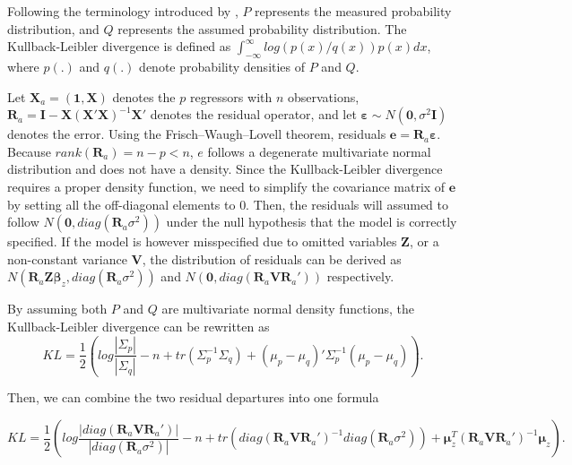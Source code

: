 \documentclass[]{interact}
\theoremstyle{plain}%
\theoremstyle{definition}
\theoremstyle{remark}
\begin{document}
Following the terminology introduced by \citet{kullback1951information},
\(P\) represents the measured probability distribution, and \(Q\)
represents the assumed probability distribution. The Kullback-Leibler
divergence is defined as
\(\int_{-\infty}^{\infty}log(p(x)/q(x))p(x)dx\), where \(p(.)\) and
\(q(.)\) denote probability densities of \(P\) and \(Q\).

Let \(\boldsymbol{X}_a = (\boldsymbol{1}, \boldsymbol{X})\) denotes the
\(p\) regressors with \(n\) observations,
\(\boldsymbol{R}_a = \boldsymbol{I} -\boldsymbol{X}(\boldsymbol{X}'\boldsymbol{X})^{-1}\boldsymbol{X}'\)
denotes the residual operator, and let
\(\boldsymbol{\varepsilon} \sim N(\boldsymbol{0},\sigma^2\boldsymbol{I})\)
denotes the error. Using the Frisch--Waugh--Lovell theorem, residuals
\(\boldsymbol{e} = \boldsymbol{R}_a\boldsymbol{\varepsilon}\). Because
\(rank(\boldsymbol{R}_a) = n - p < n\), \(e\) follows a degenerate
multivariate normal distribution and does not have a density. Since the
Kullback-Leibler divergence requires a proper density function, we need
to simplify the covariance matrix of \(\boldsymbol{e}\) by setting all
the off-diagonal elements to 0. Then, the residuals will assumed to
follow \(N(\boldsymbol{0}, diag(\boldsymbol{R}_a\sigma^2))\) under the
null hypothesis that the model is correctly specified. If the model is
however misspecified due to omitted variables \(\boldsymbol{Z}\), or a
non-constant variance \(\boldsymbol{V}\), the distribution of residuals
can be derived as
\(N(\boldsymbol{R}_a\boldsymbol{Z}\boldsymbol{\beta}_z, diag(\boldsymbol{R}_a\sigma^2))\)
and
\(N(\boldsymbol{0}, diag(\boldsymbol{R}_a\boldsymbol{V}\boldsymbol{R}_a'))\)
respectively.

By assuming both \(P\) and \(Q\) are multivariate normal density
functions, the Kullback-Leibler divergence can be rewritten as
\[KL = \frac{1}{2}\left(log\frac{|\Sigma_p|}{|\Sigma_q|} - n + tr(\Sigma_p^{-1}\Sigma_q) + (\mu_p - \mu_q)'\Sigma_p^{-1}(\mu_p - \mu_q)\right).\]

Then, we can combine the two residual departures into one formula

\small

\begin{equation}
\label{eq:effect-size}
KL = \frac{1}{2}\left(log\frac{|diag(\boldsymbol{R}_a\boldsymbol{V}\boldsymbol{R}_a')|}{|diag(\boldsymbol{R}_a\sigma^2)|} - n + tr(diag(\boldsymbol{R}_a\boldsymbol{V}\boldsymbol{R}_a')^{-1}diag(\boldsymbol{R}_a\sigma^2)) + \boldsymbol{\mu}_z^{T}(\boldsymbol{R}_a\boldsymbol{V}\boldsymbol{R}_a')^{-1}\boldsymbol{\mu}_z\right).
\end{equation}
\end{document}
